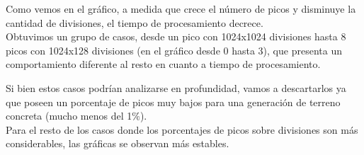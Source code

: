 Como vemos en el gráfico, a medida que crece el número de picos y disminuye la cantidad de divisiones, el tiempo de procesamiento decrece.\\

Obtuvimos un grupo de casos, desde un pico con 1024x1024 divisiones hasta 8 picos con 1024x128 divisiones (en el gráfico desde 0 hasta 3), que presenta un comportamiento diferente al resto en cuanto a tiempo de procesamiento.

Si bien estos casos podrían analizarse en profundidad, vamos a descartarlos ya que poseen un porcentaje de picos muy bajos para una generación de terreno concreta (mucho menos del 1$\%$).\\

Para el resto de los casos donde los porcentajes de picos sobre divisiones son más considerables, las gráficas se observan más estables.